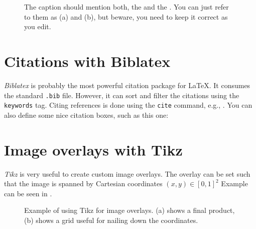 \begin{figure}[htbp]
  \centering
  \caption{The caption should mention both, the  and the . You can just refer to them as (a) and (b), but beware, you need to keep it correct as you edit.}
  \label{fig:uavs}
\end{figure}

\section{Citations with Biblatex}

\emph{Biblatex} is probably the most powerful citation package for LaTeX.
It consumes the standard \texttt{.bib} file. However, it can sort and filter the citations using the \texttt{keywords} tag.
Citing references is done using the \texttt{cite} command, e.g., \cite{baca2021mrs}.
You can also define some nice citation boxes, such as this one:

\section{Image overlays with Tikz}

\emph{Tikz} is very useful to create custom image overlays.
The overlay can be set such that the image is spanned by Cartesian coordinates $\left(x, y\right) \in \left[0, 1\right]^2$
Example can be seen in .

\begin{figure}[htbp]

  \centering

  

  \caption{Example of using Tikz for image overlays. (a) shows a final product, (b) shows a grid useful for nailing down the coordinates.}
  \label{fig:tikz_overlay}

\end{figure}

